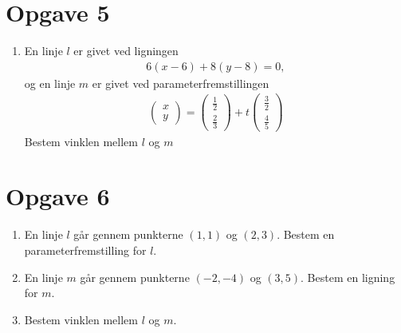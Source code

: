 \section*{Opgave 5}
\begin{enumerate}[label=\roman*)]
	\item En linje $l$ er givet ved ligningen
	\begin{align*}
		6(x-6) + 8(y-8) = 0,
	\end{align*}
	og en linje $m$ er givet ved parameterfremstillingen
	\begin{align*}
		\begin{pmatrix}
			x \\ y
		\end{pmatrix} = 
		\begin{pmatrix}
			\frac{1}{2} \\ \frac{2}{3}
		\end{pmatrix} + t
		\begin{pmatrix}
			\frac{3}{2} \\ \frac{4}{5}
		\end{pmatrix}
	\end{align*}
	Bestem vinklen mellem $l$ og $m$
\end{enumerate}

\section*{Opgave 6}
\begin{enumerate}[label=\roman*)]
	\item En linje $l$ går gennem punkterne $(1,1)$ og $(2,3)$. Bestem en parameterfremstilling for 
	$l$. 
	\item En linje $m$ går gennem punkterne $(-2,-4)$ og $(3,5)$. Bestem en ligning for $m$.
	\item Bestem vinklen mellem $l$ og $m$.
\end{enumerate}

